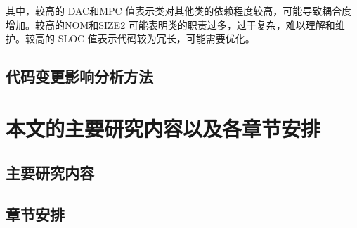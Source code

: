 其中，较高的 DAC和MPC 值表示类对其他类的依赖程度较高，可能导致耦合度增加。较高的NOM和SIZE2 可能表明类的职责过多，过于复杂，难以理解和维护。较高的 SLOC 值表示代码较为冗长，可能需要优化。


\subsection{代码变更影响分析方法}


\section{本文的主要研究内容以及各章节安排}
\subsection{主要研究内容}
\subsection{章节安排}


